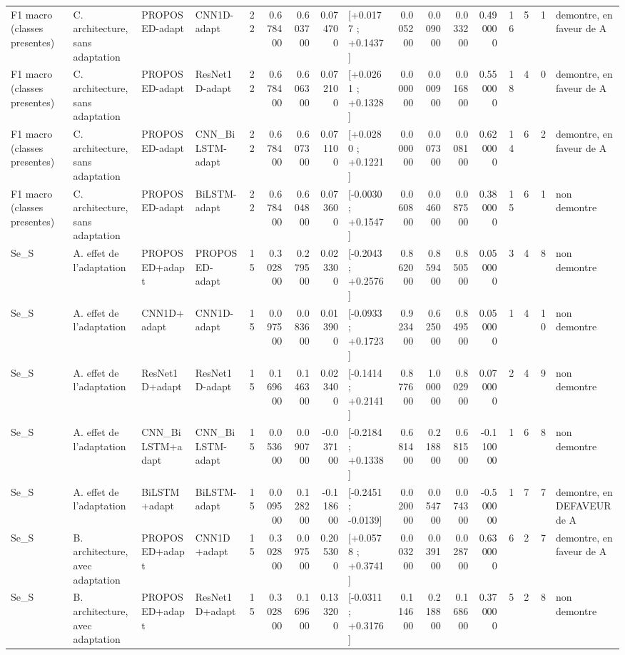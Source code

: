 \begin{tabular}{llllrrrrlrrrrrrrl}
F1 macro (classes presentes) & C. architecture, sans adaptation & PROPOSED-adapt & CNN1D-adapt & 22 & 0.678400 & 0.603700 & 0.074700 & [+0.0177 ; +0.1437] & 0.005200 & 0.009000 & 0.033200 & 0.490000 & 16 & 5 & 1 & demontre, en faveur de A \\
F1 macro (classes presentes) & C. architecture, sans adaptation & PROPOSED-adapt & ResNet1D-adapt & 22 & 0.678400 & 0.606300 & 0.072100 & [+0.0261 ; +0.1328] & 0.000000 & 0.000900 & 0.016800 & 0.550000 & 18 & 4 & 0 & demontre, en faveur de A \\
F1 macro (classes presentes) & C. architecture, sans adaptation & PROPOSED-adapt & CNN_BiLSTM-adapt & 22 & 0.678400 & 0.607300 & 0.071100 & [+0.0280 ; +0.1221] & 0.000000 & 0.007300 & 0.008100 & 0.620000 & 14 & 6 & 2 & demontre, en faveur de A \\
F1 macro (classes presentes) & C. architecture, sans adaptation & PROPOSED-adapt & BiLSTM-adapt & 22 & 0.678400 & 0.604800 & 0.073600 & [-0.0030 ; +0.1547] & 0.060800 & 0.046000 & 0.087500 & 0.380000 & 15 & 6 & 1 & non demontre \\
Se_S & A. effet de l'adaptation & PROPOSED+adapt & PROPOSED-adapt & 15 & 0.302800 & 0.279500 & 0.023300 & [-0.2043 ; +0.2576] & 0.862000 & 0.859400 & 0.850500 & 0.050000 & 3 & 4 & 8 & non demontre \\
Se_S & A. effet de l'adaptation & CNN1D+adapt & CNN1D-adapt & 15 & 0.097500 & 0.083600 & 0.013900 & [-0.0933 ; +0.1723] & 0.923400 & 0.625000 & 0.849500 & 0.050000 & 1 & 4 & 10 & non demontre \\
Se_S & A. effet de l'adaptation & ResNet1D+adapt & ResNet1D-adapt & 15 & 0.169600 & 0.146300 & 0.023400 & [-0.1414 ; +0.2141] & 0.877600 & 1.000000 & 0.802900 & 0.070000 & 2 & 4 & 9 & non demontre \\
Se_S & A. effet de l'adaptation & CNN_BiLSTM+adapt & CNN_BiLSTM-adapt & 15 & 0.053600 & 0.090700 & -0.037100 & [-0.2184 ; +0.1338] & 0.681400 & 0.218800 & 0.681500 & -0.110000 & 1 & 6 & 8 & non demontre \\
Se_S & A. effet de l'adaptation & BiLSTM+adapt & BiLSTM-adapt & 15 & 0.009500 & 0.128200 & -0.118600 & [-0.2451 ; -0.0139] & 0.020000 & 0.054700 & 0.074300 & -0.500000 & 1 & 7 & 7 & demontre, en DEFAVEUR de A \\
Se_S & B. architecture, avec adaptation & PROPOSED+adapt & CNN1D+adapt & 15 & 0.302800 & 0.097500 & 0.205300 & [+0.0578 ; +0.3741] & 0.003200 & 0.039100 & 0.028700 & 0.630000 & 6 & 2 & 7 & demontre, en faveur de A \\
Se_S & B. architecture, avec adaptation & PROPOSED+adapt & ResNet1D+adapt & 15 & 0.302800 & 0.169600 & 0.133200 & [-0.0311 ; +0.3176] & 0.114600 & 0.218800 & 0.168600 & 0.370000 & 5 & 2 & 8 & non demontre \\

\end{tabular}
